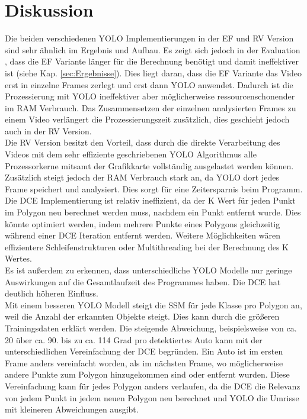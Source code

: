 \chapter{Diskussion}
\label{ch:Diskussion}
{ 
	Die beiden verschiedenen YOLO Implementierungen in der EF und RV Version sind sehr ähnlich im Ergebnis und Aufbau. Es zeigt sich jedoch in der Evaluation , dass die EF Variante länger für die Berechnung benötigt und damit ineffektiver ist (siehe Kap. \ref{sec:Ergebnisse}). Dies liegt daran, dass die EF Variante das Video erst in einzelne Frames zerlegt und erst dann YOLO anwendet. Dadurch ist die Prozessierung mit YOLO ineffektiver aber möglicherweise ressourcenschonender im RAM Verbrauch.  Das Zusammensetzen der einzelnen analysierten Frames zu einem Video verlängert die Prozessierungszeit zusätzlich, dies geschieht jedoch auch in der RV Version. \\
	Die RV Version besitzt den Vorteil, dass durch die direkte Verarbeitung des Videos mit dem sehr effiziente geschriebenen YOLO Algorithmus alle Prozessorkerne mitsamt der Grafikkarte vollständig ausgelastet werden können. Zusätzlich steigt jedoch der RAM Verbrauch stark an, da YOLO dort jedes Frame speichert und analysiert. Dies sorgt für eine Zeitersparnis beim Programm. \\ 
	Die DCE Implementierung ist relativ ineffizient, da der K Wert für jeden Punkt im Polygon neu berechnet werden muss, nachdem ein Punkt entfernt wurde. Dies könnte optimiert werden, indem mehrere Punkte eines Polygons gleichzeitig während einer DCE Iteration entfernt werden. Weitere Möglichkeiten wären effizientere Schleifenstrukturen oder Multithreading bei der Berechnung des K Wertes. \\
	Es ist außerdem zu erkennen, dass unterschiedliche YOLO Modelle nur geringe Auswirkungen auf die Gesamtlaufzeit des Programmes haben. Die DCE hat deutlich höheren Einfluss. \\
	
	Mit einem besseren YOLO Modell steigt die SSM für jede Klasse pro Polygon an, weil die Anzahl der erkannten Objekte steigt. Dies kann durch die größeren Trainingsdaten erklärt werden. Die steigende Abweichung, beispielsweise von ca. 20 über ca. 90. bis zu ca. 114 Grad pro detektiertes Auto kann mit der unterschiedlichen Vereinfachung der DCE begründen. Ein Auto ist im ersten Frame anders vereinfacht worden, als im nächsten Frame, wo möglicherweise andere Punkte zum Polygon hinzugekommen sind oder entfernt wurden. Diese Vereinfachung kann für jedes Polygon anders verlaufen, da die DCE die Relevanz von jedem Punkt in jedem neuen Polygon neu berechnet und YOLO die Umrisse mit kleineren Abweichungen ausgibt.

}

